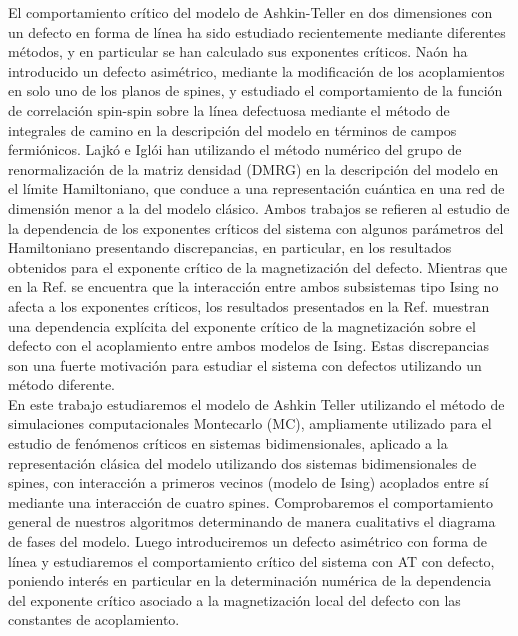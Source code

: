 El comportamiento crítico del modelo de Ashkin-Teller en dos dimensiones con un defecto en forma de línea ha sido estudiado
 recientemente mediante diferentes m\'etodos, y en particular se han calculado sus exponentes críticos. Na\'on \cite{AT_naon} ha introducido un defecto asim\'etrico, mediante la modificaci\'on
 de los acoplamientos en solo uno de los planos de spines, y estudiado el comportamiento de la funci\'on de correlaci\'on
 spin-spin sobre la línea defectuosa mediante el método de integrales de camino en la descripción del modelo en términos de campos fermiónicos.
 Lajk\'o e Igl\'oi \cite{AT_lajko}
 han utilizando el método numérico del grupo de renormalización de la matriz densidad (DMRG) en la descripción del modelo en el límite Hamiltoniano,
 que conduce a una representación cuántica en una red de dimensión menor a la del modelo clásico. Ambos trabajos se refieren al estudio de
 la dependencia de los exponentes críticos del sistema con algunos parámetros del Hamiltoniano presentando discrepancias, en particular, en los resultados
 obtenidos para el exponente crítico de la magnetización del defecto. Mientras que en la Ref. \cite{AT_naon} se encuentra que la interacci\'on entre ambos subsistemas tipo Ising
 no afecta a los exponentes cr\'iticos, los resultados presentados en la Ref. \cite{AT_lajko} muestran una dependencia expl\'icita del exponente cr\'itico de la magnetizaci\'on
 sobre el defecto con el acoplamiento entre ambos modelos de Ising. Estas discrepancias son una fuerte motivación para estudiar el sistema con defectos utilizando
 un método diferente.\\ 
En este trabajo estudiaremos el modelo de Ashkin Teller utilizando el método de simulaciones computacionales Montecarlo (MC), ampliamente utilizado
 para el estudio de fenómenos críticos en sistemas bidimensionales, aplicado a la representación clásica del modelo utilizando dos sistemas bidimensionales de spines,
 con interacci\'on a primeros vecinos (modelo de Ising) acoplados entre s\'i mediante una interacci\'on de cuatro spines. Comprobaremos el comportamiento general de nuestros
 algoritmos determinando de manera cualitativs el diagrama de fases del modelo. Luego introduciremos un defecto asim\'etrico con forma de l\'inea y estudiaremos el comportamiento
 cr\'itico del sistema con AT con defecto, poniendo inter\'es en particular en la determinaci\'on numérica de la dependencia del exponente crítico asociado a la magnetización
 local del defecto con las constantes de acoplamiento.\\
